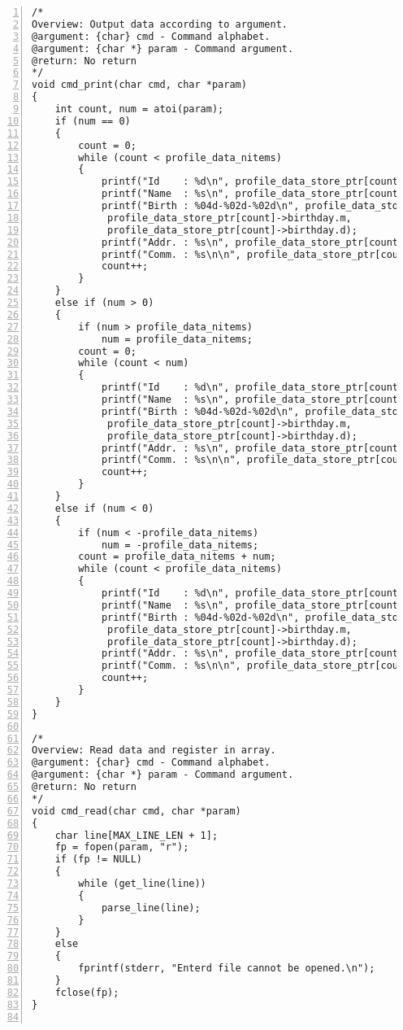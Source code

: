 \documentclass[autodetect-engine,dvi=dvipdfmx,ja=standard,
               a4j,11pt]{bxjsarticle}
\begin{document}
\begin{Verbatim}[numbers=left, xleftmargin=10mm, numbersep=6pt,
    fontsize=\small, baselinestretch=0.8]
/*
Overview: Output data according to argument.
@argument: {char} cmd - Command alphabet.
@argument: {char *} param - Command argument.
@return: No return
*/
void cmd_print(char cmd, char *param)
{
    int count, num = atoi(param);
    if (num == 0)
    {
        count = 0;
        while (count < profile_data_nitems)
        {
            printf("Id    : %d\n", profile_data_store_ptr[count]->id);
            printf("Name  : %s\n", profile_data_store_ptr[count]->name);
            printf("Birth : %04d-%02d-%02d\n", profile_data_store_ptr[count]->birthday.y,
             profile_data_store_ptr[count]->birthday.m,
             profile_data_store_ptr[count]->birthday.d);
            printf("Addr. : %s\n", profile_data_store_ptr[count]->address);
            printf("Comm. : %s\n\n", profile_data_store_ptr[count]->note);
            count++;
        }
    }
    else if (num > 0)
    {
        if (num > profile_data_nitems)
            num = profile_data_nitems;
        count = 0;
        while (count < num)
        {
            printf("Id    : %d\n", profile_data_store_ptr[count]->id);
            printf("Name  : %s\n", profile_data_store_ptr[count]->name);
            printf("Birth : %04d-%02d-%02d\n", profile_data_store_ptr[count]->birthday.y,
             profile_data_store_ptr[count]->birthday.m,
             profile_data_store_ptr[count]->birthday.d);
            printf("Addr. : %s\n", profile_data_store_ptr[count]->address);
            printf("Comm. : %s\n\n", profile_data_store_ptr[count]->note);
            count++;
        }
    }
    else if (num < 0)
    {
        if (num < -profile_data_nitems)
            num = -profile_data_nitems;
        count = profile_data_nitems + num;
        while (count < profile_data_nitems)
        {
            printf("Id    : %d\n", profile_data_store_ptr[count]->id);
            printf("Name  : %s\n", profile_data_store_ptr[count]->name);
            printf("Birth : %04d-%02d-%02d\n", profile_data_store_ptr[count]->birthday.y,
             profile_data_store_ptr[count]->birthday.m,
             profile_data_store_ptr[count]->birthday.d);
            printf("Addr. : %s\n", profile_data_store_ptr[count]->address);
            printf("Comm. : %s\n\n", profile_data_store_ptr[count]->note);
            count++;
        }
    }
}

/*
Overview: Read data and register in array.
@argument: {char} cmd - Command alphabet.
@argument: {char *} param - Command argument.
@return: No return
*/
void cmd_read(char cmd, char *param)
{
    char line[MAX_LINE_LEN + 1];
    fp = fopen(param, "r");
    if (fp != NULL)
    {
        while (get_line(line))
        {
            parse_line(line);
        }
    }
    else
    {
        fprintf(stderr, "Enterd file cannot be opened.\n");
    }
    fclose(fp);
}


\end{Verbatim}
\end{document}
